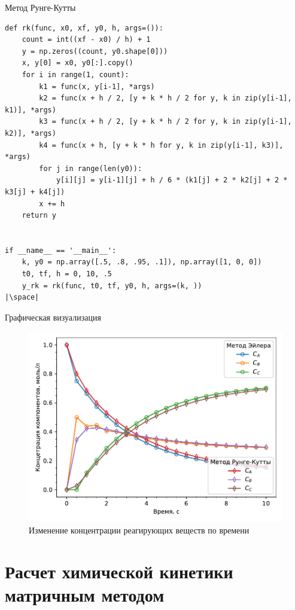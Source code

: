 \documentclass[aspectratio=169, mathserif]{beamer}	%
\begin{document}
\begin{frame}[fragile, ]{Метод Рунге-Кутты}
\scriptsize
\begin{verbatim}
def rk(func, x0, xf, y0, h, args=()):
    count = int((xf - x0) / h) + 1
    y = np.zeros((count, y0.shape[0]))
    x, y[0] = x0, y0[:].copy()
    for i in range(1, count):
        k1 = func(x, y[i-1], *args)
        k2 = func(x + h / 2, [y + k * h / 2 for y, k in zip(y[i-1], k1)], *args)
        k3 = func(x + h / 2, [y + k * h / 2 for y, k in zip(y[i-1], k2)], *args)
        k4 = func(x + h, [y + k * h for y, k in zip(y[i-1], k3)], *args)
        for j in range(len(y0)):
            y[i][j] = y[i-1][j] + h / 6 * (k1[j] + 2 * k2[j] + 2 * k3[j] + k4[j])
        x += h
    return y


if __name__ == '__main__':
    k, y0 = np.array([.5, .8, .95, .1]), np.array([1, 0, 0])
    t0, tf, h = 0, 10, .5
    y_rk = rk(func, t0, tf, y0, h, args=(k, ))
|\space|
\end{verbatim}
\vfill
\end{frame}


\begin{frame}[fragile, ]{Графическая визуализация}
\scriptsize
\begin{figure}
	\includegraphics[width=.6\textwidth]{./pics/plot}
	\caption{Изменение концентрации реагирующих веществ по времени}
\end{figure}
\end{frame}


\section{Расчет химической кинетики матричным методом}
\sectionframe
\end{document}
